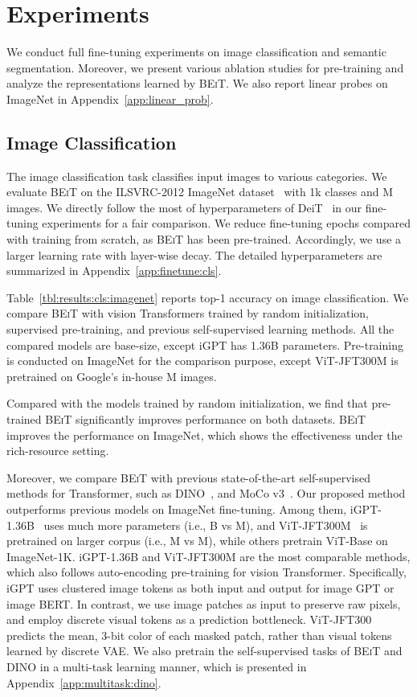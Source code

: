\documentclass{article}
\newcommand\our{\textsc{BEiT}}
\begin{document}
\section{Experiments}
\label{sec:exp}

We conduct full fine-tuning experiments on image classification and semantic segmentation.
Moreover, we present various ablation studies for pre-training and analyze the representations learned by \our{}. 
We also report linear probes on ImageNet in Appendix~\ref{app:linear_prob}.

\subsection{Image Classification}
\label{sec:image:cls}

The image classification task classifies input images to various categories.
We evaluate \our{} on the ILSVRC-2012 ImageNet dataset~\citep{imagenet} with 1k classes and M images.
We directly follow the most of hyperparameters of DeiT~\citep{deit} in our fine-tuning experiments for a fair comparison.
We reduce fine-tuning epochs compared with training from scratch, as \our{} has been pre-trained.
Accordingly, we use a larger learning rate with layer-wise decay.
The detailed hyperparameters are summarized in Appendix~\ref{app:finetune:cls}.

Table~\ref{tbl:results:cls:imagenet} reports top-1 accuracy on image classification.
We compare \our{} with vision Transformers trained by random initialization, supervised pre-training, and previous self-supervised learning methods.
All the compared models are base-size, except iGPT has 1.36B parameters.
Pre-training is conducted on ImageNet for the comparison purpose, except ViT-JFT300M is pretrained on Google's in-house M images.

Compared with the models trained by random initialization, we find that pre-trained \our{} significantly improves performance on both datasets.
\our{} improves the performance on ImageNet, which shows the effectiveness under the rich-resource setting.

Moreover, we compare \our{} with previous state-of-the-art self-supervised methods for Transformer, such as DINO~\citep{dino}, and MoCo v3~\citep{mocov3}.
Our proposed method outperforms previous models on ImageNet fine-tuning.
Among them, iGPT-1.36B~\citep{igpt} uses much more parameters (i.e., B vs M), and ViT-JFT300M~\citep{vit} is pretrained on larger corpus (i.e., M vs M), while others pretrain ViT-Base on ImageNet-1K.
iGPT-1.36B and ViT-JFT300M are the most comparable methods, which also follows auto-encoding pre-training for vision Transformer.
Specifically, iGPT uses clustered image tokens as both input and output for image GPT or image BERT.
In contrast, we use image patches as input to preserve raw pixels, and employ discrete visual tokens as a prediction bottleneck.
ViT-JFT300 predicts the mean, 3-bit color of each masked patch, rather than visual tokens learned by discrete VAE.
We also pretrain the self-supervised tasks of \our{} and DINO in a multi-task learning manner, which is presented in Appendix~\ref{app:multitask:dino}.
\end{document}
